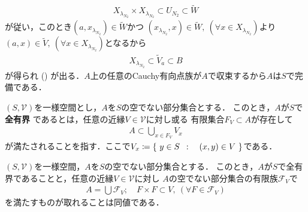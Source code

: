 \begin{prf}
		\begin{align}
			X_{\lambda_{N_2}} \times X_{\lambda_{N_2}} \subset U_{N_2} \subset \tilde{W}
		\end{align}
		が従い，このとき$(a,x_{\lambda_{N_2}}) \in \tilde{W}$かつ
		$(x_{\lambda_{N_2}},x) \in \tilde{W},\ (\forall x \in X_{\lambda_{N_2}})$より
		$(a,x) \in \tilde{V},\ (\forall x \in X_{\lambda_{N_2}})$となるから
		\begin{align}
			X_{\lambda_{N_2}} \subset \tilde{V}_a \subset B 
		\end{align}
		が得られ
()
		が出る．$A$上の任意のCauchy有向点族が$A$で収束するから$A$は$S$で完備である．
		\QED
	\end{prf}
	
	\begin{screen}
		\begin{dfn}[全有界]
			$(S,\mathscr{V})$を一様空間とし，$A$を$S$の空でない部分集合とする．
			このとき，$A$が$S$で{\bf 全有界}
			であるとは，任意の近縁$V \in \mathscr{V}$に対し或る
			有限集合$F_V \subset A$が存在して
			\begin{align}
				A \subset \bigcup_{x \in F_V} V_x
			\end{align}
			が満たされることを指す．ここで$V_x \coloneqq \left\{\ y \in S\ \, : \quad (x,y) \in V\ \right\}$である．
		\end{dfn}
	\end{screen}
	
	\begin{screen}
		\begin{thm}[全有界性の同値条件]
		\label{thm:an_equivalent_condition_of_totally_boundedness}
			$(S,\mathscr{V})$を一様空間，$A$を$S$の空でない部分集合とする．
			このとき，$A$が$S$で全有界であることと，任意の近縁$V \in \mathscr{V}$に対し
			$A$の空でない部分集合の有限族$\mathscr{F}_V$で
			\begin{align}
				A = \bigcup \mathscr{F}_V;
				\quad F \times F \subset V,
				\ (\forall F \in \mathscr{F}_V)
				\label{eq:thm_an_equivalent_condition_of_totally_boundedness}
			\end{align}
			を満たすものが取れることは同値である．
		\end{thm}
	\end{screen}
	
